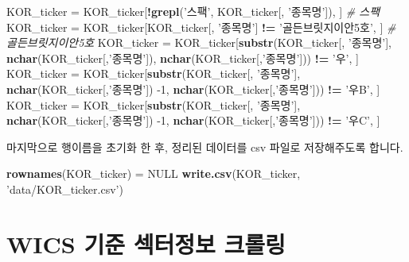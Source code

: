 \documentclass[]{book}
\newenvironment{Shaded}{\begin{snugshade}}{\end{snugshade}}
\newcommand{\CommentTok}[1]{\textcolor[rgb]{0.56,0.35,0.01}{\textit{#1}}}
\newcommand{\DecValTok}[1]{\textcolor[rgb]{0.00,0.00,0.81}{#1}}
\newcommand{\KeywordTok}[1]{\textcolor[rgb]{0.13,0.29,0.53}{\textbf{#1}}}
\newcommand{\NormalTok}[1]{#1}
\newcommand{\OperatorTok}[1]{\textcolor[rgb]{0.81,0.36,0.00}{\textbf{#1}}}
\newcommand{\OtherTok}[1]{\textcolor[rgb]{0.56,0.35,0.01}{#1}}
\newcommand{\StringTok}[1]{\textcolor[rgb]{0.31,0.60,0.02}{#1}}
\begin{document}
\begin{Shaded}
\begin{Highlighting}[]
\NormalTok{KOR_ticker =}\StringTok{ }\NormalTok{KOR_ticker[}\OperatorTok{!}\KeywordTok{grepl}\NormalTok{(}\StringTok{'스팩'}\NormalTok{, KOR_ticker[, }\StringTok{'종목명'}\NormalTok{]), ]  }\CommentTok{# 스팩}
\NormalTok{KOR_ticker =}\StringTok{ }\NormalTok{KOR_ticker[KOR_ticker[, }\StringTok{'종목명'}\NormalTok{] }\OperatorTok{!=}\StringTok{ '골든브릿지이안5호'}\NormalTok{, ] }\CommentTok{# 골든브릿지이안5호}
\NormalTok{KOR_ticker =}\StringTok{ }\NormalTok{KOR_ticker[}\KeywordTok{substr}\NormalTok{(KOR_ticker[, }\StringTok{'종목명'}\NormalTok{],}
                               \KeywordTok{nchar}\NormalTok{(KOR_ticker[,}\StringTok{'종목명'}\NormalTok{]), }\KeywordTok{nchar}\NormalTok{(KOR_ticker[,}\StringTok{'종목명'}\NormalTok{])) }\OperatorTok{!=}\StringTok{ '우'}\NormalTok{, ]}
\NormalTok{KOR_ticker =}\StringTok{ }\NormalTok{KOR_ticker[}\KeywordTok{substr}\NormalTok{(KOR_ticker[, }\StringTok{'종목명'}\NormalTok{],}
                               \KeywordTok{nchar}\NormalTok{(KOR_ticker[,}\StringTok{'종목명'}\NormalTok{]) }\DecValTok{-1}\NormalTok{, }\KeywordTok{nchar}\NormalTok{(KOR_ticker[,}\StringTok{'종목명'}\NormalTok{])) }\OperatorTok{!=}\StringTok{ '우B'}\NormalTok{, ] }
\NormalTok{KOR_ticker =}\StringTok{ }\NormalTok{KOR_ticker[}\KeywordTok{substr}\NormalTok{(KOR_ticker[, }\StringTok{'종목명'}\NormalTok{],}
                               \KeywordTok{nchar}\NormalTok{(KOR_ticker[,}\StringTok{'종목명'}\NormalTok{]) }\DecValTok{-1}\NormalTok{, }\KeywordTok{nchar}\NormalTok{(KOR_ticker[,}\StringTok{'종목명'}\NormalTok{])) }\OperatorTok{!=}\StringTok{ '우C'}\NormalTok{, ] }
\end{Highlighting}
\end{Shaded}

마지막으로 행이름을 초기화 한 후, 정리된 데이터를 csv 파일로 저장해주도록 합니다.

\begin{Shaded}
\begin{Highlighting}[]
\KeywordTok{rownames}\NormalTok{(KOR_ticker) =}\StringTok{ }\OtherTok{NULL}
\KeywordTok{write.csv}\NormalTok{(KOR_ticker, }\StringTok{'data/KOR_ticker.csv'}\NormalTok{)}
\end{Highlighting}
\end{Shaded}

\hypertarget{wics---}{%
\section{WICS 기준 섹터정보 크롤링}\label{wics---}}
\end{document}
